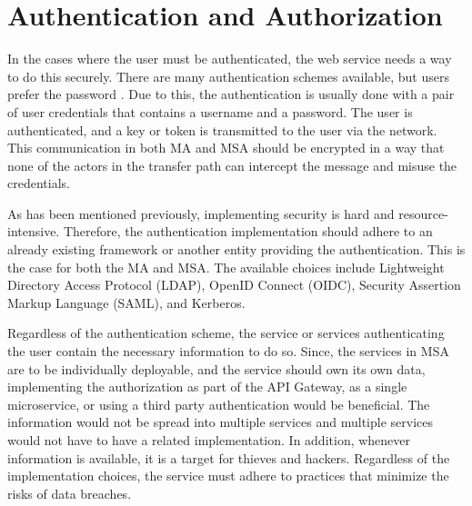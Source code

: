 \section{Authentication and Authorization}
\begin{sloppypar}
    In the cases where the user must be authenticated, the web service needs a
    way to do this securely. There are many authentication schemes available,
    but users prefer the password \citep{passwordisdead}. Due to this, the
    authentication is usually done with a pair of user credentials that contains
    a username and a password. The user is authenticated, and a key or token is
    transmitted to the user via the network. This communication in both MA and
    MSA should be encrypted in a way that none of the actors in the transfer
    path can intercept the message and misuse the credentials. 
\end{sloppypar}
\begin{sloppypar}
    As has been mentioned previously, implementing security is hard and
    resource-intensive. Therefore, the authentication implementation should
    adhere to an already existing framework or another entity providing the
    authentication. This is the case for both the MA and MSA. The available
    choices include Lightweight Directory Access Protocol (LDAP), OpenID Connect
    (OIDC), Security Assertion Markup Language (SAML), and Kerberos.
\end{sloppypar}
\begin{sloppypar}
    Regardless of the authentication scheme, the service or services
    authenticating the user contain the necessary information to do so. Since,
    the services in MSA are to be individually deployable, and the service should
    own its own data, implementing the authorization as part of the API Gateway,
    as a single microservice, or using a third party authentication would be
    beneficial. The information would not be spread into multiple services and
    multiple services would not have to have a related implementation. In
    addition, whenever information is available, it is a target for thieves and
    hackers. Regardless of the implementation choices, the service must adhere
    to practices that minimize the risks of data breaches. 
\end{sloppypar}

